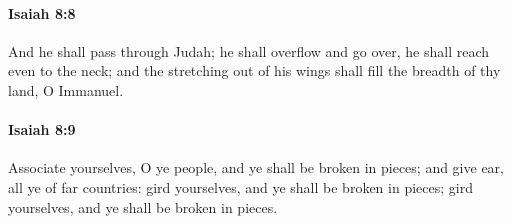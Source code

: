		\paragraph{Isaiah 8:8} %
			\label{ISAIAH-8-8}

			And he shall pass through Judah; he shall overflow and go over, he shall reach even to the neck; and the stretching out of his wings shall fill the breadth of thy land, O Immanuel.


		\paragraph{Isaiah 8:9} %
			\label{ISAIAH-8-9}

			Associate yourselves, O ye people, and ye shall be broken in pieces; and give ear, all ye of far countries: gird yourselves, and ye shall be broken in pieces; gird yourselves, and ye shall be broken in pieces.

